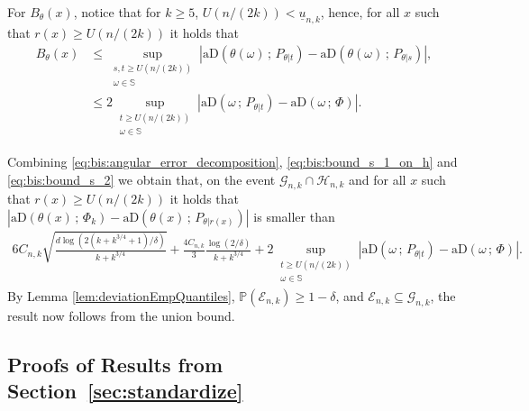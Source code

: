 \documentclass{article}
\numberwithin{equation}{section}
\renewcommand{\P}{\mathbb{P}}
\newcommand{\sphere}{\mathbb{S}}
\newcommand{\aD}[2]{{\mathrm{aD}}\left({#1}\,;\,{#2}\right)}
\begin{document}
    For \(B_\theta(x)\), notice that for \(k\geq 5\),
    \(U(n/(2k))<\underline{u}_{n,k}\), hence,
    for all \(x\) such that \(r(x)\geq U(n/(2k))\) it holds that
    \begin{align}
        B_\theta(x) & \leq \sup_{\substack{s,t\geq U(n/(2k))
        \\\omega\in\sphere} }{\left|\aD{\theta(\omega)}{P_{\theta|t}}
        - \aD{\theta(\omega)}{P_{\theta|s}}\right|}, \nonumber \\
        & \leq 2\sup_{\substack {t\geq U(n/(2k))   \\ \omega\in
        \sphere}}\left|\aD{\omega}{P_{\theta|t}} -
        \aD{\omega}{\Phi}\right|.
        \label{eq:bis:bound_s_2}
    \end{align}

    Combining \eqref{eq:bis:angular_error_decomposition},
    \eqref{eq:bis:bound_s_1_on_h} and \eqref{eq:bis:bound_s_2} we obtain
    that, on the event \(\mathcal{G}_{n,k}\cap\mathcal{H}_{n,k}\) and for all
    \(x\) such that \(r(x)\geq U(n/(2k))\)
    it holds that
    \(\left|\aD{\theta(x)}{\Phi_k}-\aD{\theta(x)}{P_{\theta|r(x)}}\right|\)
    is smaller than
    \begin{align*}
        6C_{n,k}\sqrt{\frac{d\log{(2(k+k^{3/4}+1)/\delta)}}{k+k^{3/4}}}+\frac{4C_{n,k}}{3}\frac{\log(2/\delta)}{k+k^{3/4}}+
        2\sup_{\substack {t\geq U(n/(2k)) \\ \omega\in
        \sphere}}\left|\aD{\omega}{P_{\theta|t}} -
        \aD{\omega}{\Phi}\right|.
    \end{align*}
    By Lemma \ref{lem:deviationEmpQuantiles},
    \(\P(\mathcal{E}_{n,k})\geq 1-\delta\), and
    \(\mathcal{E}_{n,k}\subseteq\mathcal{G}_{n,k}\), the result
    now follows from the union bound.



\subsection{Proofs of Results from Section~\ref{sec:standardize}}\label{sec:proofs_standardize}
%
\end{document}
